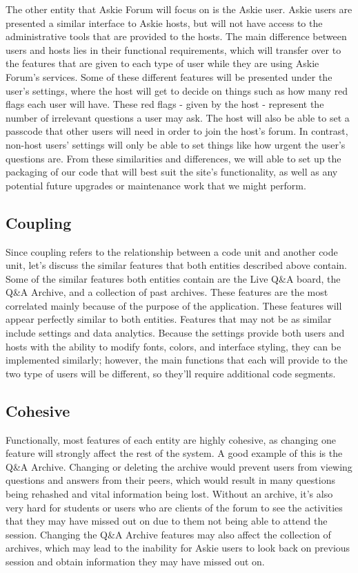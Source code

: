 \documentclass[12pt]{article}
\begin{document}
The other entity that Askie Forum will focus on is the Askie user. Askie users are presented a similar interface to Askie hosts, but will not have access to the administrative tools that are provided to the hosts. The main difference between users and hosts lies in their functional requirements, which will transfer over to the features that are given to each type of user while they are using Askie Forum's services. Some of these different features will be presented under the user's settings, where the host will get to decide on things such as how many red flags each user will have. These red flags - given by the host - represent the number of irrelevant questions a user may ask. The host will also be able to set a passcode that other users will need in order to join the host's forum. In contrast, non-host users' settings will only be able to set things like how urgent the user's questions are. From these similarities and differences, we will able to set up the packaging of our code that will best suit the site's functionality, as well as any potential future upgrades or maintenance work that we might perform. 
\subsection{Coupling}
Since coupling refers to the relationship between a code unit and another code unit, let's discuss the similar features that both entities described above contain. Some of the similar features both entities contain are the Live Q\&A board, the Q\&A Archive, and a collection of past archives. These features are the most correlated mainly because of the purpose of the application. These features will appear perfectly similar to both entities. Features that may not be as similar include settings and data analytics. Because the settings provide both users and hosts with the ability to modify fonts, colors, and interface styling, they can be implemented similarly; however, the main functions that each will provide to the two type of users will be different, so they'll require additional code segments.  
\subsection{Cohesive}
Functionally, most features of each entity are highly cohesive, as changing one feature will strongly affect the rest of the system. A good example of this is the Q\&A Archive. Changing or deleting the archive would prevent users from viewing questions and answers from their peers, which would result in many questions being rehashed and vital information being lost. Without an archive, it's also very hard for students or users who are clients of the forum to see the activities that they may have missed out on due to them not being able to attend the session. Changing the Q\&A Archive features may also affect the collection of archives, which may lead to the inability for Askie users to look back on previous session and obtain information they may have missed out on. 
\end{document}
